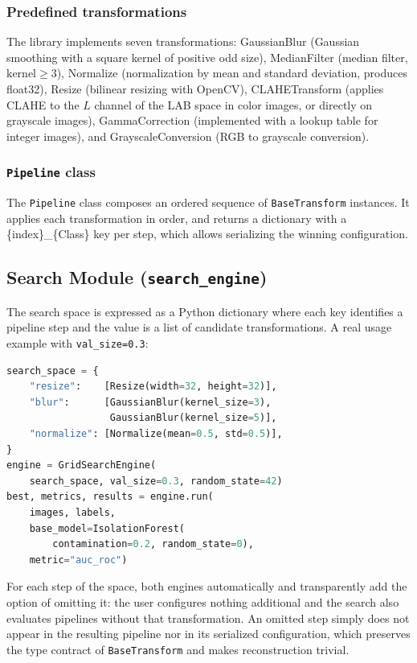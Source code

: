 \documentclass[conference]{IEEEtran}
\begin{document}
\subsubsection{Predefined transformations}

The library implements seven transformations: GaussianBlur (Gaussian smoothing
with a square kernel of positive odd size), MedianFilter (median filter,
$\text{kernel} \geq 3$), Normalize (normalization by mean and standard
deviation, produces float32), Resize (bilinear resizing with OpenCV),
CLAHETransform (applies CLAHE to the $L$ channel of the LAB space in color
images, or directly on grayscale images), GammaCorrection (implemented with a
lookup table for integer images), and GrayscaleConversion (RGB to grayscale
conversion).

\subsubsection{\texttt{Pipeline} class}

The \texttt{Pipeline} class composes an ordered sequence of
\texttt{BaseTransform} instances. It applies each transformation in order, and
returns a dictionary with a \{index\}\_\{Class\} key per step, which allows
serializing the winning configuration.

\subsection{Search Module (\texttt{search\_engine})}

The search space is expressed as a Python dictionary where each key identifies
a pipeline step and the value is a list of candidate transformations. A real
usage example with \texttt{val\_size=0.3}:

\begin{lstlisting}[language=Python]
search_space = {
    "resize":    [Resize(width=32, height=32)],
    "blur":      [GaussianBlur(kernel_size=3),
                  GaussianBlur(kernel_size=5)],
    "normalize": [Normalize(mean=0.5, std=0.5)],
}
engine = GridSearchEngine(
    search_space, val_size=0.3, random_state=42)
best, metrics, results = engine.run(
    images, labels,
    base_model=IsolationForest(
        contamination=0.2, random_state=0),
    metric="auc_roc")
\end{lstlisting}

For each step of the space, both engines automatically and transparently add
the option of omitting it: the user configures nothing additional and the
search also evaluates pipelines without that transformation. An omitted step
simply does not appear in the resulting pipeline nor in its serialized
configuration, which preserves the type contract of \texttt{BaseTransform} and
makes reconstruction trivial.
\end{document}
